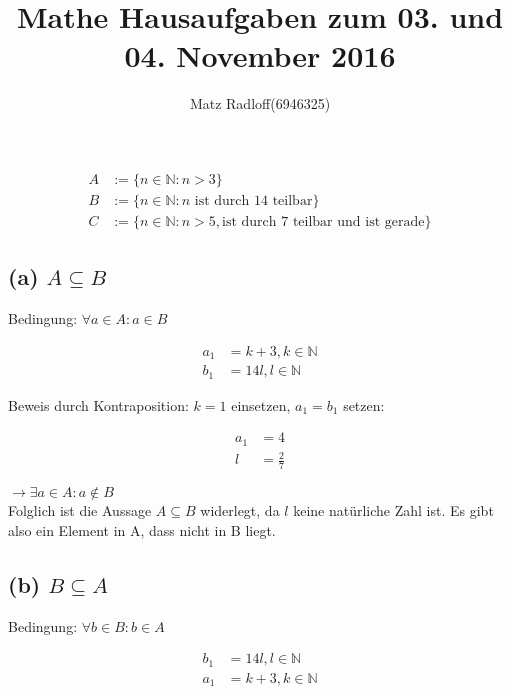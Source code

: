 \documentclass[11pt,a4paper]{article}
\title{\textbf{Mathe Hausaufgaben zum 03. und 04. November 2016}}
\author{Matz Radloff(6946325)}
\begin{document}
  \maketitle
  \date{}
  \tableofcontents
  \newpage

\section{}

\begin{align}
A &:= \{n \in \mathbb{N} : n > 3\}\\
B &:= \{n \in \mathbb{N} : n \mbox{ ist durch 14 teilbar}\}\\
C &:= \{n \in \mathbb{N} : n > 5, \mbox{ist durch 7 teilbar und ist gerade}\}
\end{align}

\subsection[(a)]{(a) $A \subseteq B$}

Bedingung: $\forall a \in A : a \in B$

\begin{align}
a_{1} &= k+3, k \in \mathbb{N}\\
b_{1} &= 14l, l \in \mathbb{N}
\end{align}

Beweis durch Kontraposition: $k=1$ einsetzen, $a_{1} = b_{1}$ setzen:

\begin{align}
a_{1} &= 4\\
l &= \frac{2}{7}
\end{align}

$\rightarrow \exists a \in A : a \notin B$\\
Folglich ist die Aussage $A \subseteq B$ widerlegt, da $l$ keine natürliche Zahl ist. Es gibt also ein Element in A, dass nicht in B liegt.

\subsection[(b)]{(b) $B \subseteq A$}

Bedingung: $\forall b \in B : b \in A$

\begin{align}
b_{1} &= 14l, l \in \mathbb{N}\\
a_{1} &= k+3, k \in \mathbb{N}
\end{align}
\end{document}
